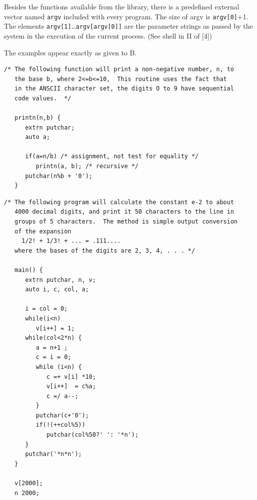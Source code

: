 \documentclass[12pt]{report}
\begin{document}
Besides the functions available from the library, there is a
predefined external vector named \verb|argv| included with every
program. The size of argv is \verb|argv[0]|+1. The elements
\verb|argv[1]|\ldots \verb|argv[argv[0]]| are the parameter strings
as passed by the system in the execution of the current process. (See
shell in II of [4])


The examples appear exactly as given to B.


\begin{verbatim}
/* The following function will print a non-negative number, n, to
   the base b, where 2<=b<=10,  This routine uses the fact that
   in the ANSCII character set, the digits O to 9 have sequential
   code values.  */

   printn(n,b) {
      extrn putchar;
      auto a;

      if(a=n/b) /* assignment, not test for equality */
         printn(a, b); /* recursive */
      putchar(n%b + '0');
   }
\end{verbatim}

\begin{verbatim}
/* The following program will calculate the constant e-2 to about
   4000 decimal digits, and print it 50 characters to the line in
   groups of 5 characters.  The method is simple output conversion
   of the expansion
     1/2! + 1/3! + ... = .111....
   where the bases of the digits are 2, 3, 4, . . . */

   main() {
      extrn putchar, n, v;
      auto i, c, col, a;

      i = col = 0;
      while(i<n)
         v[i++] = 1;
      while(col<2*n) {
         a = n+1 ;
         c = i = 0;
         while (i<n) {
            c =+ v[i] *10;
            v[i++]  = c%a;
            c =/ a--;
         }
         putchar(c+'0');
         if(!(++col%5))
            putchar(col%50?' ': '*n');
      }
      putchar('*n*n');
   }

   v[2000];
   n 2000;
\end{verbatim}

\end{document}
